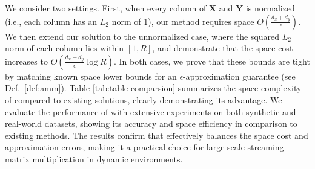 We consider two settings. First, when every column of \(\boldsymbol{X}\) and \(\boldsymbol{Y}\) is normalized (i.e., each column has an \(L_2\) norm of 1), our method requires space \(O\left(\frac{d_x+d_y}{\epsilon}\right)\). We then extend our solution to the unnormalized case, where the squared \(L_2\) norm of each column lies within \([1, R]\), and demonstrate that the space cost increases to \(O\left(\frac{d_x+d_y}{\epsilon}\log R\right)\). In both cases, we prove that these bounds are tight by matching known space lower bounds for an \(\epsilon\)-approximation guarantee (see Def.\ \ref{def:amm}). Table \ref{tab:table-comparsion} summarizes the space complexity of {\oursolution} compared to existing solutions, clearly demonstrating its advantage. We evaluate the performance of {\oursolution} with extensive experiments on both synthetic and real-world datasets, showing its accuracy and space efficiency in comparison to existing methods. The results confirm that {\oursolution} effectively balances the space cost and approximation errors, making it a practical choice for large-scale streaming matrix multiplication in dynamic environments.


































